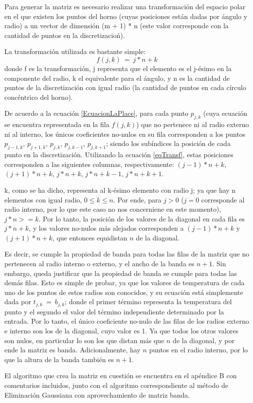 \par Para generar la matriz es necesario realizar una transformaci\'on del espacio polar en el que existen los puntos del horno (cuyas posiciones est\'an dadas por \'angulo y radio) a un vector de dimensi\'on (m + 1) * n (este valor corresponde con la cantidad de puntos en la discretizacio\'n). 
\par La transformaci\'on utilizada es bastante simple: 
\begin{equation}
f(j, k)\ =\ j * n + k
\label{eqTransf}
\end{equation}
donde f es la transformaci\'on, j representa que el elemento es el j-\'esimo en la componente del radio, k el equivalente para el \'angulo, y n es la cantidad de puntos de la discretizaci\'on con igual radio (la cantidad de puntos en cada c\'irculo conc\'entrico del horno).
\par De acuerdo a la ecuaci\'on \ref{EcuacionLaPlace}, para cada punto $p_{j, k}$ (cuya ecuaci\'on se encuentra representada en la fila $f(j, k)$) que no pertenece ni al radio externo ni al interno, los \'unicos coeficientes no-nulos en su fila corresponden a los puntos $p_{j-1, k}$, $p_{j+1, k}$, $p_{j, k}$, $p_{j, k-1}$, $p_{j, k+1}$; siendo los sub\'indices la posici\'on de cada punto en la discretizaci\'on. 
Utilizando la ecuaci\'on \ref{eqTransf}, estas posiciones corresponden a las siguientes columnas, respectivamente: $(j-1) * n + k$, $(j+1) * n + k$, $j * n + k$, $j * n + k - 1$, $j * n + k + 1$. 
\par k, como se ha dicho, representa al k-\'esimo elemento con radio j; ya que hay n elementos con igual radio, $0\leq k\leq n$. Por ende, para $j > 0$ ($j = 0$ corresponde al radio interno, por lo que este caso no nos concerniene en este momento), $j * n >= k$. 
Por lo tanto, la posici\'on de los valores de la diagonal en cada fila es $j*n+k$, y los valores no-nulos m\'as alejados corresponden a $(j-1) * n + k$ y $(j+1) * n + k$, que entonces equidistan $n$ de la diagonal. 
\par Es decir, se cumple la propiedad de banda para todas las filas de la matriz que no pertenecen al radio interno o externo, y el ancho de la banda es $n+1$. 
Sin embargo, queda justificar que la propiedad de banda se cumple para todas las dem\'as filas. 
Esto es simple de probar, ya que los valores de temperatura de cada uno de los puntos de estos radios son conocidos, y su ecuaci\'on est\'a simplemente dada por $t_{j, k}\ =\ b_{j, k}$; donde el primer t\'ermino representa la temperatura del punto y el segundo el valor del t\'ermino independiente determinado por la entrada.
Por lo tanto, el \'unico coeficiente no-nulo de las filas de los radios externo e interno son los de la diagonal, cuyo valor es 1.
Ya que todos los otros valores son nulos, en particular lo son los que distan m\'as que $n$ de la diagonal, y por ende la matriz es banda. Adicionalmente, hay $n$ puntos en el radio interno, por lo que la altura de la banda tambi\'en es $n+1$.
\par El algoritmo que crea la matriz en cuestión se encuentra en el apéndice B con comentarios incluidos, junto con el algoritmo correspondiente al método de Eliminación Gaussiana con aprovechamiento de matriz banda.


